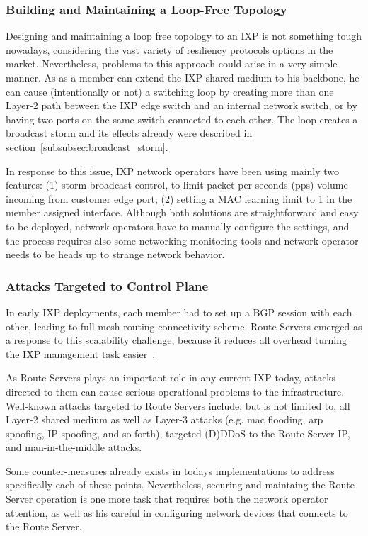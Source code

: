 \documentclass[conference]{IEEEtran/IEEEtran}
\begin{document}
\subsubsection{Building and Maintaining a Loop-Free Topology}
Designing and maintaining a loop free topology to an IXP is not something tough nowadays, considering the vast variety of resiliency protocols options in the market. Nevertheless, problems to this approach could arise in a very simple manner. As as a member can extend the IXP shared medium to his backbone, he can cause (intentionally or not) a switching loop by creating more than one Layer-2 path between the IXP edge switch and an internal network switch, or by having two ports on the same switch connected to each other. The loop creates a broadcast storm and its effects already were described in section~\ref{subsubsec:broadcast_storm}.

In response to this issue, IXP network operators have been using mainly two features: (1) storm broadcast control, to limit packet per seconds (pps) volume incoming from customer edge port; (2) setting a MAC learning limit to 1 in the member assigned interface. Although both solutions are straightforward and easy to be deployed, network operators have to manually configure the settings, and the process requires also some networking monitoring tools and network operator needs to be heads up to strange network behavior.

\subsubsection{Attacks Targeted to Control Plane}
In early IXP deployments, each member had to set up a BGP session with each other, leading to full mesh routing connectivity scheme. Route Servers emerged as a response to this scalability challenge, because it reduces all overhead turning the IXP management task easier~\cite{lu2005networking}.

As Route Servers plays an important role in any current IXP today, attacks directed to them can cause serious operational problems to the infrastructure. Well-known attacks targeted to Route Servers include, but is not limited to, all Layer-2 shared medium as well as Layer-3 attacks (e.g. mac flooding, arp spoofing, IP spoofing, and so forth), targeted (D)DDoS to the Route Server IP, and man-in-the-middle attacks.

Some counter-measures already exists in todays implementations to address specifically each of these points. Nevertheless, securing and maintaing the Route Server operation is one more task that requires both the network operator attention, as well as his careful in configuring network devices that connects to the Route Server.
\end{document}
